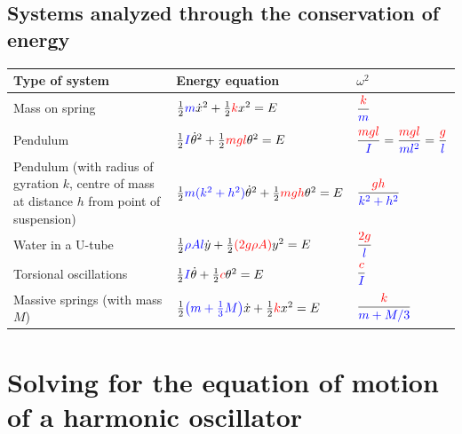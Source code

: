 \documentclass[11pt,letterpaper,titlepage,oneside]{book}
\begin{document}
\subsection{Systems analyzed through the conservation of energy}
\begin{center}
	\renewcommand{\arraystretch}{2.5}
	\begin{tabular}[t]{lll}
		\hline
		Type of system & Energy equation & $\omega^2$ \\ \hline
		Mass on spring &
			$\frac{1}{2}\textcolor{blue}{m}\dot{x}^2 + \frac{1}{2}\textcolor{red}{k}x^2 = E $ &
			$\dfrac{\color{red}{k}}{\color{blue}m}$
			\\
		Pendulum &
			$\frac{1}{2}\textcolor{blue}{I}\dot{\theta}^2 + \frac{1}{2}\textcolor{red}{mgl}\theta^2 = E $ &
			$\dfrac{\color{red}{mgl}}{\color{blue}{I}} = \dfrac{\color{red}{mgl}}{\color{blue}{ml^2}}= \dfrac{\color{red}{g}}{\color{blue}{l}}$ 
			\\
		\parbox{5.5cm}{Pendulum \footnotesize(with radius of gyration $k$, centre of mass at distance $h$ from point of suspension)}&
			$\frac{1}{2}\textcolor{blue}{m(k^2+h^2)}\dot{\theta}^2 + \frac{1}{2}\textcolor{red}{mgh}\theta^2 = E $ &
			$\dfrac{\color{red}{gh}}{\color{blue}{k^2+h^2}}$ 
			\\
		Water in a U-tube &
			$\frac{1}{2}\textcolor{blue}{\rho Al}\dot{y} + \frac{1}{2}\textcolor{red}{(2g\rho A)}y^2 = E$ &
			$\dfrac{\color{red}{2g}}{\color{blue}l}$ 
			\\
		Torsional oscillations &
			$\frac{1}{2}\textcolor{blue}{I}\dot{\theta} + \frac{1}{2}\textcolor{red}{c}\theta^2 = E$ &
			$\dfrac{\color{red}{c}}{\color{blue}I}$ 
			\\
		\parbox{5cm}{Massive springs \\\footnotesize{(with mass $M$)}} &
			$\frac{1}{2}\textcolor{blue}{\left(m + \frac{1}{3}M \right)}\dot{x} + \frac{1}{2}\textcolor{red}{k}x^2 = E$ &
			$\dfrac{\color{red}{k}}{\color{blue}{m + M/3}}$ 
			\\
		\hline
	\end{tabular}
	\renewcommand{\arraystretch}{1}
\end{center}


\section{Solving for the equation of motion of a harmonic oscillator}
\end{document}
